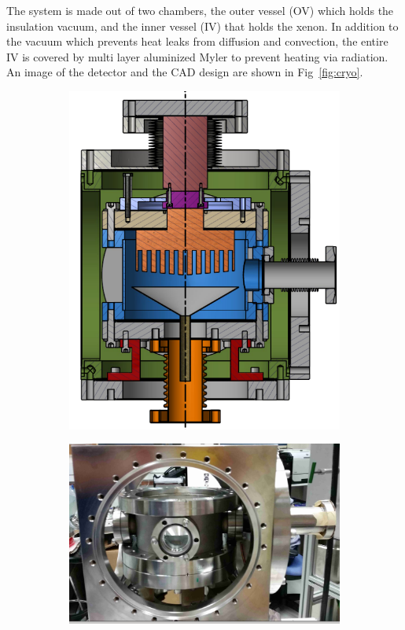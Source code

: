 The system is made out of two chambers, the outer vessel (OV) which holds the insulation vacuum, and the inner vessel (IV) that holds the xenon. In addition to the vacuum which prevents heat leaks from diffusion and convection, the entire IV is covered by multi layer aluminized Myler to prevent heating via radiation. An image of the detector and the CAD design are shown in Fig~\ref{fig:cryo}. 
\begin{figure}
	   \centering
	       \begin{subfigure}[c]{0.25\textheight}
		           \includegraphics[width=\textwidth]{cryoMirror.png}
			       \end{subfigure}
			           \begin{subfigure}[c]{0.25\textheight}
					       \includegraphics[width=\textwidth]{cryoOpenCrop.png}

\end{subfigure}
\end{figure}
